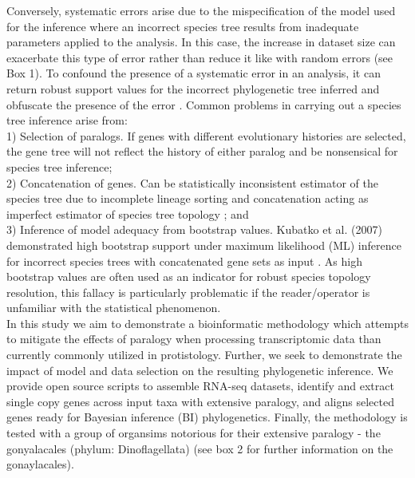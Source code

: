 \documentclass[12pt]{article}
\begin{document}
Conversely, systematic errors arise due to the mispecification of the model used for the inference where an incorrect species tree results from inadequate parameters applied to the analysis. 
In this case, the increase in dataset size can exacerbate this type of error rather than reduce it like with random errors (see Box 1).  
To confound the presence of a systematic error in an analysis, it can return robust support values for the incorrect phylogenetic tree inferred and obfuscate the presence of the error \cite{jeffroy2006phylogenomics,roch2015likelihood,kubatko2007inconsistency}. 
Common problems in carrying out a species tree inference arise from:\\
1) Selection of paralogs. 
If genes with different evolutionary histories are selected, the gene tree will not reflect the history of either paralog and be nonsensical for species tree inference; \\
2) Concatenation of genes. 
Can be statistically inconsistent estimator of the species tree due to incomplete lineage sorting and concatenation acting as imperfect estimator of species tree topology \cite{roch2015likelihood}; and \\
3) Inference of model adequacy from bootstrap values. 
Kubatko et al. (2007) demonstrated high bootstrap support under maximum likelihood (ML) inference for incorrect species trees with concatenated gene sets as input \cite{kubatko2007inconsistency}. 
As high bootstrap values are often used as an indicator for robust species topology resolution, this fallacy is particularly problematic if the reader/operator is unfamiliar with the statistical phenomenon.\\
In this study we aim to demonstrate a bioinformatic methodology which attempts to mitigate the effects of paralogy when processing transcriptomic data than currently commonly utilized in protistology. 
Further, we seek to demonstrate the impact of model and data selection on the resulting phylogenetic inference. 
We provide open source scripts to assemble RNA-seq datasets, identify and extract single copy genes across input taxa with extensive paralogy, and aligns selected genes ready for Bayesian inference (BI) phylogenetics. 
Finally, the methodology is tested with a group of organsims notorious for their extensive paralogy - the gonyalacales (phylum: Dinoflagellata) (see box 2 for further information on the gonaylacales).
\end{document}
